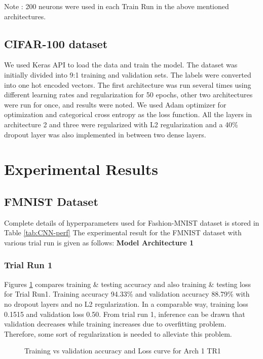 \documentclass{article}
\begin{document}
\noindent Note : 200 neurons were used in each Train Run in the above mentioned architectures.

\subsection{CIFAR-100 dataset}
We used Keras API to load the data and train the model. The dataset was initially divided into 9:1 training and validation sets. The labels were converted into one hot encoded vectors. The first architecture was run several times using different learning rates and regularization for 50 epochs, other two architectures were run for once, and results were noted. We used Adam optimizer for optimization and categorical cross entropy as the loss function. All the layers in architecture 2 and three were regularized with L2 regularization and a 40\% dropout layer was also implemented in between two dense layers.

\section{Experimental Results}
\subsection{FMNIST Dataset}
Complete details of hyperparameters used for Fashion-MNIST dataset is stored in Table \ref{tab:CNN-perf} \newline
The experimental result for the FMNIST dataset with various trial run is given as follows:
\vspace{5 mm}
\newline
\textbf{Model Architecture 1}
\subsubsection{Trial Run 1}

Figures \ref{fig:Arch1_Tr1} compares training & testing accuracy and also training & testing loss for Trial Run1. Training accuracy 94.33\% and validation accuracy 88.79\% with no dropout layers and no L2 regularization. In a comparable way, training loss 0.1515 and validation loss 0.50. From trial run 1, inference can be drawn that validation decreases while training increases due to overfitting problem. Therefore, some sort of regularization is needed to alleviate this problem.

\begin{figure}[H]
    \centering
    \qquad
    \caption{Training vs validation accuracy and Loss curve for Arch 1 TR1}%
    \label{fig:Arch1_Tr1}%
\end{figure}
\end{document}
